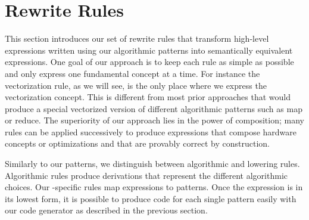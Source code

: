 \section{Rewrite Rules}
\label{section:rules}

This section introduces our set of rewrite rules that transform high-level expressions written using our algorithmic patterns into semantically equivalent expressions.
One goal of our approach is to keep each rule as simple as possible and only express one fundamental concept at a time.
For instance the vectorization rule, as we will see, is the only place where we express the vectorization concept.
This is different from most prior approaches that would produce a special vectorized version of different algorithmic patterns such as map or reduce.
The superiority of our approach lies in the power of composition;
many rules can be applied successively to produce expressions that compose hardware concepts or optimizations and that are provably correct by construction.

Similarly to our patterns, we distinguish between algorithmic and lowering rules.
Algorithmic rules produce derivations that represent the different algorithmic choices.
Our \OpenCL-specific rules map expressions to \OpenCL patterns.
Once the expression is in its lowest form, it is possible to produce \OpenCL code for each single pattern easily with our code generator as described in the previous section.




\newenvironment{rerule}[1]%
{\begin{equation}\begin{array}{#1}\ignorespaces}%
{\end{array}\end{equation}%
\ignorespacesafterend}

